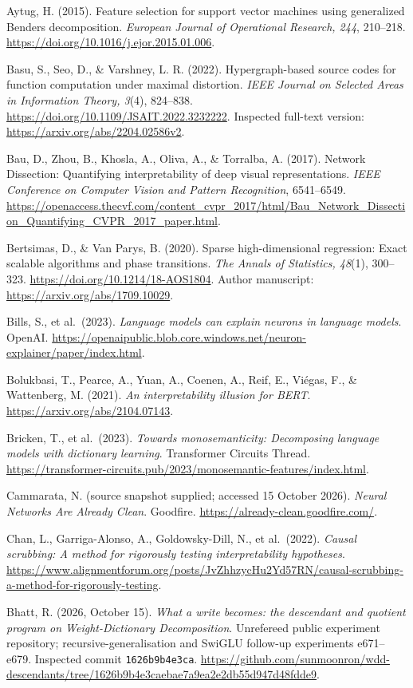 \documentclass[
  british,
  11pt,
  a4paper,
]{article}
\begin{document}
Aytug, H. (2015). Feature selection for support vector machines using
generalized Benders decomposition. \emph{European Journal of Operational
Research, 244}, 210--218.
\url{https://doi.org/10.1016/j.ejor.2015.01.006}.

Basu, S., Seo, D., \& Varshney, L. R. (2022). Hypergraph-based source
codes for function computation under maximal distortion. \emph{IEEE
Journal on Selected Areas in Information Theory, 3}(4), 824--838.
\url{https://doi.org/10.1109/JSAIT.2022.3232222}. Inspected full-text
version: \url{https://arxiv.org/abs/2204.02586v2}.

Bau, D., Zhou, B., Khosla, A., Oliva, A., \& Torralba, A. (2017).
Network Dissection: Quantifying interpretability of deep visual
representations. \emph{IEEE Conference on Computer Vision and Pattern
Recognition}, 6541--6549.
\url{https://openaccess.thecvf.com/content_cvpr_2017/html/Bau_Network_Dissection_Quantifying_CVPR_2017_paper.html}.

Bertsimas, D., \& Van Parys, B. (2020). Sparse high-dimensional
regression: Exact scalable algorithms and phase transitions. \emph{The
Annals of Statistics, 48}(1), 300--323.
\url{https://doi.org/10.1214/18-AOS1804}. Author manuscript:
\url{https://arxiv.org/abs/1709.10029}.

Bills, S., et al.~(2023). \emph{Language models can explain neurons in
language models}. OpenAI.
\url{https://openaipublic.blob.core.windows.net/neuron-explainer/paper/index.html}.

Bolukbasi, T., Pearce, A., Yuan, A., Coenen, A., Reif, E., Viégas, F.,
\& Wattenberg, M. (2021). \emph{An interpretability illusion for BERT}.
\url{https://arxiv.org/abs/2104.07143}.

Bricken, T., et al.~(2023). \emph{Towards monosemanticity: Decomposing
language models with dictionary learning}. Transformer Circuits Thread.
\url{https://transformer-circuits.pub/2023/monosemantic-features/index.html}.

Cammarata, N. (source snapshot supplied; accessed 15 October 2026).
\emph{Neural Networks Are Already Clean}. Goodfire.
\url{https://already-clean.goodfire.com/}.

Chan, L., Garriga-Alonso, A., Goldowsky-Dill, N., et al.~(2022).
\emph{Causal scrubbing: A method for rigorously testing interpretability
hypotheses}.
\url{https://www.alignmentforum.org/posts/JvZhhzycHu2Yd57RN/causal-scrubbing-a-method-for-rigorously-testing}.

Bhatt, R. (2026, October 15). \emph{What a write becomes: the descendant
and quotient program on Weight-Dictionary Decomposition}. Unrefereed
public experiment repository; recursive-generalisation and SwiGLU
follow-up experiments e671--e679. Inspected commit
\texttt{1626b9b4e3ca}.
\url{https://github.com/sunmoonron/wdd-descendants/tree/1626b9b4e3caebae7a9ea2e2db55d947d48fdde9}.
\end{document}
